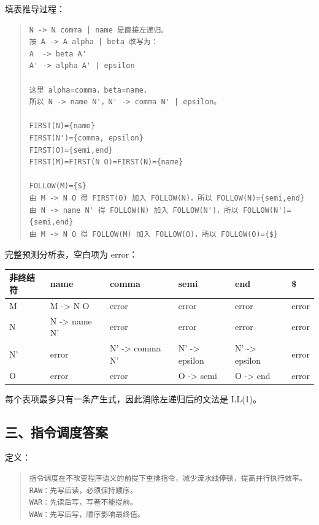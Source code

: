 \documentclass[UTF8,zihao=-4]{ctexart}
\begin{document}
填表推导过程：

\begin{quote}
\footnotesize
\begin{verbatim}
N -> N comma | name 是直接左递归。
按 A -> A alpha | beta 改写为：
A  -> beta A'
A' -> alpha A' | epsilon

这里 alpha=comma，beta=name，
所以 N -> name N'，N' -> comma N' | epsilon。

FIRST(N)={name}
FIRST(N')={comma, epsilon}
FIRST(O)={semi,end}
FIRST(M)=FIRST(N O)=FIRST(N)={name}

FOLLOW(M)={$}
由 M -> N O 得 FIRST(O) 加入 FOLLOW(N)，所以 FOLLOW(N)={semi,end}
由 N -> name N' 得 FOLLOW(N) 加入 FOLLOW(N')，所以 FOLLOW(N')={semi,end}
由 M -> N O 得 FOLLOW(M) 加入 FOLLOW(O)，所以 FOLLOW(O)={$}
\end{verbatim}
\end{quote}

完整预测分析表，空白项为 error：

\begin{center}
\footnotesize
\begin{tabular}{llllll}
\hline
非终结符 & name & comma & semi & end & \$ \\
\hline
M & M -> N O & error & error & error & error \\
N & N -> name N' & error & error & error & error \\
N' & error & N' -> comma N' & N' -> epsilon & N' -> epsilon & error \\
O & error & error & O -> semi & O -> end & error \\
\hline
\end{tabular}
\end{center}

每个表项最多只有一条产生式，因此消除左递归后的文法是 LL(1)。



\subsection{三、指令调度答案}


定义：


\begin{quote}
\footnotesize
\begin{verbatim}
指令调度在不改变程序语义的前提下重排指令，减少流水线停顿，提高并行执行效率。
RAW：先写后读，必须保持顺序。
WAR：先读后写，写者不能提前。
WAW：先写后写，顺序影响最终值。
\end{verbatim}
\end{quote}
\end{document}
